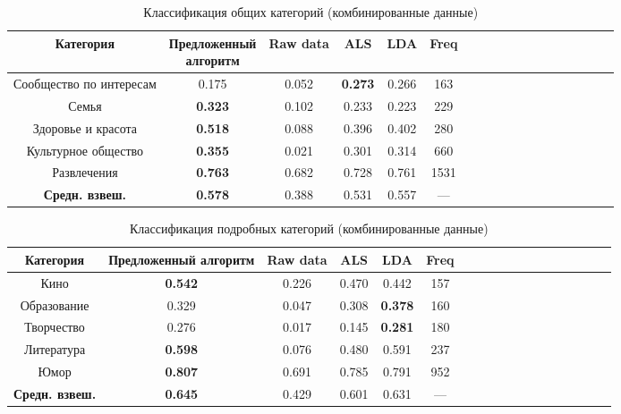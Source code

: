\documentclass[times,specification,annotation]{itmo-student-thesis}
\begin{document}
\begin{table}[!h]
\caption{Классификация общих категорий (комбинированные данные)}\label{tab-combined-g}
\centering
\begin{tabular}{|*{18}{c|}}\hline
Категория & \thead{Предложенный \\  алгоритм} & Raw data & ALS & LDA & Freq \\\hline
Сообщество по интересам           & 0.175 & 0.052 & \textbf{0.273} & 0.266 & 163 \\\hline
Семья           & \textbf{0.323} & 0.102 & 0.233 & 0.223 & 229 \\\hline
Здоровье и красота            & \textbf{0.518} & 0.088 & 0.396 & 0.402 & 280  \\\hline
Культурное общество           & \textbf{0.355} & 0.021 & 0.301 & 0.314 & 660 \\\hline
Развлечения            & \textbf{0.763} & 0.682 & 0.728 & 0.761 & 1531 \\\hline
\textbf{Средн. взвеш. } & \textbf{0.578} & 0.388 & 0.531 & 0.557 & --- \\\hline
\end{tabular}
\end{table}


\begin{table}[!h]
\caption{Классификация подробных категорий (комбинированные данные)}\label{tab-combined-d}
\centering
\begin{tabular}{|*{18}{c|}}\hline
Категория & Предложенный алгоритм  & Raw data & ALS & LDA & Freq \\\hline
Кино            & \textbf{0.542} & 0.226 & 0.470 & 0.442 & 157 \\\hline
Образование           & 0.329 & 0.047 & 0.308 & \textbf{0.378} & 160 \\\hline
Творчество            & 0.276 & 0.017 & 0.145 & \textbf{0.281} & 180 \\\hline
Литература          & \textbf{0.598} & 0.076 & 0.480 & 0.591 & 237  \\\hline
Юмор           & \textbf{0.807} & 0.691 & 0.785 & 0.791 & 952 \\\hline
\textbf{Средн. взвеш.}  & \textbf{0.645} & 0.429 & 0.601 & 0.631 & --- \\\hline
\end{tabular}
\end{table}
\end{document}
